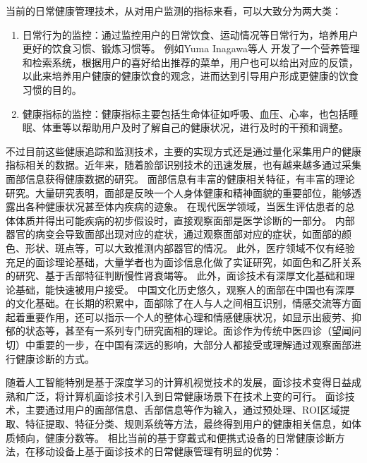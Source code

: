 当前的日常健康管理技术，从对用户监测的指标来看，可以大致分为两大类：

\begin{enumerate}
    \item 日常行为的监控：通过监控用户的日常饮食、运动情况等日常行为，培养用户更好的饮食习惯、锻炼习惯等\cite{purpura2011fit4life,Inagawa2013A,cordeiro2015barriers, miller2014stepstream}。 例如Yuma Inagawa等人\cite{Inagawa2013A} 开发了一个营养管理和检索系统，根据用户的喜好给出推荐的菜单，用户也可以给出对应的反馈，以此来培养用户健康的健康饮食的观念，进而达到引导用户形成更健康的饮食习惯的目的。
    \item 健康指标的监控：健康指标主要包括生命体征如呼吸、血压、心率，也包括睡眠、体重等\cite{kay2012lullaby,gronvall2013beyond,walters2010a}以帮助用户及时了解自己的健康状况，进行及时的干预和调整。
\end{enumerate}

不过目前这些健康追踪和监测技术，主要的实现方式还是通过量化采集用户的健康指标相关的数据。近年来，随着脸部识别技术的迅速发展，也有越来越多通过采集面部信息获得健康数据的研究。
面部信息有丰富的健康相关特征，有丰富的理论研究。大量研究表明，面部是反映一个人身体健康和精神面貌的重要部位，能够透露出各种健康状况甚至体内疾病的迹象。
在现代医学领域，当医生评估患者的总体体质并得出可能疾病的初步假设时，直接观察面部是医学诊断的一部分\cite{Clifford2006Shortliffe}。
内部器官的病变会导致面部出现对应的症状，通过观察面部对应的症状，如面部的颜色、形状、斑点等，可以大致推测内部器官的情况\cite{汪珺2018六经辨证中自然辩证法三大规律初探}。
此外，医疗领域不仅有经验充足的面诊理论基础，大量学者也为面诊信息化做了实证研究，如面色和乙肝关系的研究\cite{吴秀艳2014108}、基于舌部特征判断慢性肾衰竭\cite{周小芳2018慢性肾衰患者虚兼湿浊证的口唇特征研究}等。
此外，面诊技术有深厚文化基础和理论基础，能快速被用户接受。
中国文化历史悠久，观察人的面部在中国也有深厚的文化基础。在长期的积累中，面部除了在人与人之间相互识别，情感交流等方面起着重要作用，还可以指示一个人的整体心理和情感健康状况，如显示出疲劳、抑郁的状态等，甚至有一系列专门研究面相的理论。面诊作为传统中医四诊（望闻问切）中重要的一步，在中国有深远的影响，大部分人都接受或理解通过观察面部进行健康诊断的方式。


随着人工智能特别是基于深度学习的计算机视觉技术的发展，面诊技术变得日益成熟和广泛，将计算机面诊技术引入到日常健康场景下在技术上变的可行。
面诊技术，主要通过用户的面部信息、舌部信息等作为输入，通过预处理、ROI区域提取、特征提取、特征分类、规则系统等方法，最终得到用户的健康相关信息，如体质倾向，健康分数等\cite{林锋2019中医面诊系统调研报告}。
相比当前的基于穿戴式和便携式设备的日常健康诊断方法，在移动设备上基于面诊技术的日常健康管理有明显的优势：

